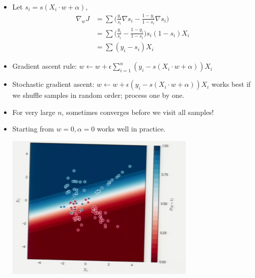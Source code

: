 \documentclass[10pt]{article}
\begin{document}
\begin{itemize}
\begin{center}
			\end{center}
			\item Let $s_{i} = s(X_{i}\cdot w + \alpha)$,
			\begin{align*}
				\nabla_{w} J &= \sum\Big(\frac{y_{i}}{s_{i}}\nabla s_{i} - \frac{1-y_{i}}{1 - s_{i}} \nabla s_{i}\Big)\\
					&= \sum \Big(\frac{y_{i}}{s_{i}} - \frac{1-y_{i}}{1 - s_{i}}\Big) s_{i} (1 - s_{i})X_{i}\\
					&= \sum (y_{i} - s_{i})X_{i}
			\end{align*}
			
			\item Gradient ascent rule: $w \leftarrow w + \epsilon \sum_{i=1}^{n}(y_{i} - s(X_{i}\cdot w + \alpha))X_{i}$
			\item Stochastic gradient ascent: $w \leftarrow w + \epsilon(y_{i} - s(X_{i}\cdot w + \alpha))X_{i}$ works best if we shuffle samples in random order; process one by one.
			\item For very large $n$, sometimes converges before we visit all samples!
			\item Starting from $w=0, \alpha=0$ works well in practice.
			\begin{center}
				\includegraphics[scale=0.5]{../images/regression}
			\end{center}
		\end{itemize}
\end{document}

